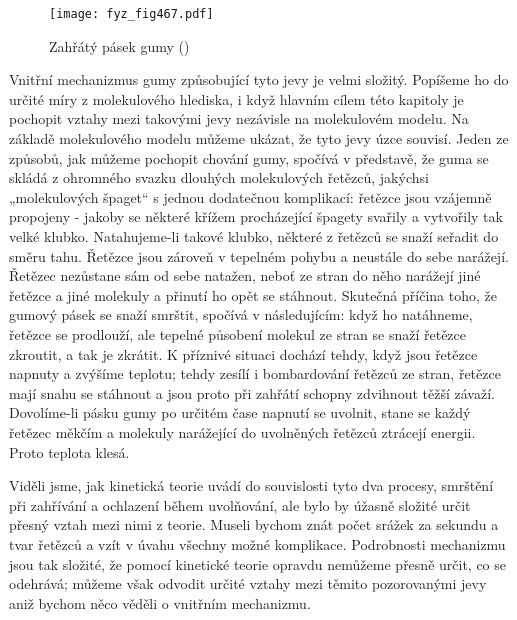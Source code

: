     \begin{figure}[ht!] %
      \centering
      \texttt{[image: fyz\_fig467.pdf]}
      \caption{ Zahřátý pásek gumy (\cite[s.~596]{Feynman01})}
      \label{fyz:fig467}
    \end{figure}

    Vnitřní mechanizmus gumy způsobující tyto jevy je velmi složitý. Popíšeme ho do určité míry z
    molekulového hlediska, i když hlavním cílem této kapitoly je pochopit vztahy mezi takovými jevy
    nezávisle na molekulovém modelu. Na základě molekulového modelu můžeme ukázat, že tyto jevy úzce
    souvisí. Jeden ze způsobů, jak můžeme pochopit chování gumy, spočívá v představě, že guma se
    skládá z ohromného svazku dlouhých molekulových řetězců, jakýchsi „molekulových špaget“ s
    jednou dodatečnou komplikací: řetězce jsou vzájemně propojeny - jakoby se některé křížem
    procházející špagety svařily a vytvořily tak velké klubko. Natahujeme-li takové klubko, některé
    z řetězců se snaží seřadit do směru tahu. Řetězce jsou zároveň v tepelném pohybu a neustále do
    sebe narážejí. Řetězec nezůstane sám od sebe natažen, neboť ze stran do něho narážejí jiné
    řetězce a jiné molekuly a přinutí ho opět se stáhnout. Skutečná příčina toho, že gumový pásek se
    snaží smrštit, spočívá v následujícím: když ho natáhneme, řetězce se prodlouží, ale tepelné
    působení molekul ze stran se snaží řetězce zkroutit, a tak je zkrátit. K příznivé situaci
    dochází tehdy, když jsou řetězce napnuty  a zvýšíme teplotu; tehdy zesílí i bombardování řetězců
    ze stran, řetězce mají snahu se stáhnout a jsou proto při zahřátí schopny zdvihnout těžší
    závaží. Dovolíme-li pásku gumy po určitém čase napnutí se uvolnit, stane se každý řetězec měkčím
    a molekuly narážející do uvolněných řetězců ztrácejí energii. Proto teplota klesá.

    Viděli jsme, jak kinetická teorie uvádí do souvislosti tyto dva procesy, smrštění při zahřívání
    a ochlazení během uvolňování, ale bylo by úžasně složité určit přesný vztah mezi nimi z teorie.
    Museli bychom znát počet srážek za sekundu a tvar řetězců a vzít v úvahu všechny možné
    komplikace. Podrobnosti mechanizmu jsou tak složité, že pomocí kinetické teorie opravdu
    nemůžeme přesně určit, co se odehrává; můžeme však odvodit určité vztahy mezi těmito
    pozorovanými jevy aniž bychom něco věděli o vnitřním mechanizmu.

